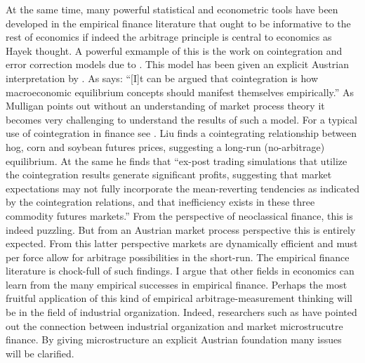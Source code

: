 \documentclass[11pt,]{article}
\begin{document}
At the same time, many powerful statistical and econometric tools have
been developed in the empirical finance literature that ought to be
informative to the rest of economics if indeed the arbitrage principle
is central to economics as Hayek thought. A powerful exmample of this is
the work on cointegration and error correction models due to
\citet{EngleGranger1987}. This model has been given an explicit Austrian
interpretation by \citet{Mulligan2005}. As \citet{Koop2006} says:
``{[}I{]}t can be argued that cointegration is how macroeconomic
equilibrium concepts should manifest themselves empirically.'' As
Mulligan points out without an understanding of market process theory it
becomes very challenging to understand the results of such a model. For
a typical use of cointegration in finance see \citet{Liu2005}. Liu finds
a cointegrating relationship between hog, corn and soybean futures
prices, suggesting a long-run (no-arbitrage) equilibrium. At the same he
finds that ``ex-post trading simulations that utilize the cointegration
results generate significant profits, suggesting that market
expectations may not fully incorporate the mean-reverting tendencies as
indicated by the cointegration relations, and that inefficiency exists
in these three commodity futures markets.'' From the perspective of
neoclassical finance, this is indeed puzzling. But from an Austrian
market process perspective this is entirely expected. From this latter
perspective markets are dynamically efficient and must per force allow
for arbitrage possibilities in the short-run. The empirical finance
literature is chock-full of such findings. I argue that other fields in
economics can learn from the many empirical successes in empirical
finance. Perhaps the most fruitful application of this kind of empirical
arbitrage-measurement thinking will be in the field of industrial
organization. Indeed, researchers such as \citet{Spulber1999} have
pointed out the connection between industrial organization and market
microstrucutre finance. By giving microstructure an explicit Austrian
foundation many issues will be clarified.
\end{document}
